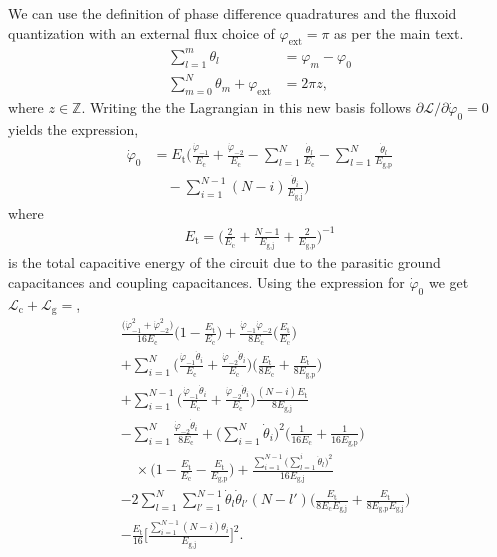 \documentclass[%
reprint,
superscriptaddress,
 amsmath,amssymb,
 aps,
 prx,
longbibliography,
floatfix,
]{revtex4-2}
\begin{document}
We can use the definition of phase difference quadratures and the fluxoid quantization with an external flux choice of $\varphi_{\mathrm{ext}}=\pi$ as per the main text.
\begin{align}
\sum_{l=1}^m\theta_l&=\varphi_m-\varphi_0\\
\sum_{m=0}^N \theta_m+\varphi_\mathrm{ext}&=2\pi z,
\end{align}
where $z\in\mathbb{Z}$. Writing the the Lagrangian in this new basis follows $\partial \mathcal{L}/\partial \dot{\varphi}_0=0$ yields the expression,
\begin{align}
\dot{\varphi}_0&=E_{\textrm{t}}\Big(\frac{\dot{\varphi}_{-1}}{E_{\textrm{c}}}+\frac{\dot{\varphi}_{-2}}{E_{\textrm{c}}}-\sum_{l=1}^{N}\frac{\dot{\theta}_l}{E_{\textrm{c}}}-\sum_{l=1}^{N}\frac{\dot{\theta}_l}{E_{\textrm{g,p}}}\nonumber\\&\quad-\sum_{i=1}^{N-1}(N-i)\frac{\dot{\theta}_i}{E_{\textrm{g,j}}}\Big)
\end{align}
where
\begin{align}
E_\textrm{t}=\Big(\frac{2}{E_{\textrm{c}}}+\frac{N-1}{E_{\textrm{g,j}}}+\frac{2}{E_{\textrm{g,p}}}\Big)^{-1}\label{eq:tot_cap}
\end{align}
is the total capacitive energy of the circuit due to the parasitic ground capacitances and coupling capacitances. Using the expression for $\dot{\varphi}_0$ we get $\mathcal{L}_\textrm{c}+\mathcal{L}_\textrm{g}=$,
\begin{align}
&\frac{\big(\dot{\varphi}^2_{-1}+\dot{\varphi}^2_{-2}\big)}{16E_\textrm{c}}\Big(1-\frac{E_\textrm{t}}{E_\textrm{c}}\Big)+\frac{\dot{\varphi}_{-1}\dot{\varphi}_{-2}}{8E_\textrm{c}}\Big(\frac{E_\textrm{t}}{E_\textrm{c}}\Big)\nonumber\\
&+\sum_{i=1}^N\Big(\frac{\dot{\varphi}_{-1}\dot{\theta}_i}{E_\textrm{c}}+\frac{\dot{\varphi}_{-2}\dot{\theta}_i}{E_\textrm{c}}\Big)\Big(\frac{E_\textrm{t}}{8E_\textrm{c}}+\frac{E_\textrm{t}}{8E_\textrm{g,p}}\Big)\nonumber\\&+\sum_{i=1}^{N-1}\Big(\frac{\dot{\varphi}_{-1}\dot{\theta}_i}{E_\textrm{c}}+\frac{\dot{\varphi}_{-2}\dot{\theta}_i}{E_\textrm{c}}\Big)\frac{(N-i)E_\textrm{t}}{8E_\textrm{g,j}}\nonumber\\
&-\sum_{i=1}^N\frac{\dot{\varphi}_{-2}\dot{\theta}_i}{8E_\textrm{c}}+\Big(\sum_{i=1}^N\dot{\theta}_i\Big)^2\Bigg(\frac{1}{16E_\textrm{c}}+\frac{1}{16E_\textrm{g,p}}\Bigg)\nonumber\\&\quad\times\Bigg(1-\frac{E_\textrm{t}}{E_\textrm{c}}-\frac{E_\textrm{t}}{E_\textrm{g,p}}\Bigg)+\frac{\sum_{i=1}^{N-1}\big(\sum_{l=1}^i\dot{\theta}_l\big)^2}{16E_\textrm{g,j}}\nonumber\\
&-2\sum_{l=1}^N \sum_{l'=1}^{N-1}\dot{\theta}_l\dot{\theta}_{l'}(N-l')\Bigg(\frac{E_\textrm{t}}{8E_\textrm{c}E_\textrm{g,j}}+\frac{E_\textrm{t}}{8E_\textrm{g,p}E_\textrm{g,j}}\Bigg)\nonumber\\
&-\frac{E_\textrm{t}}{16}\Bigg[\frac{\sum_{i=1}^{N-1}(N-i)\theta_i}{E_\textrm{g,j}}\Bigg]^2.
\end{align}
\end{document}
